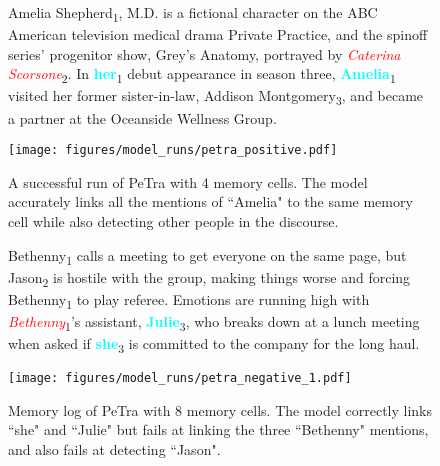 \documentclass[11pt,a4paper]{article}
\newcommand{\actcoref}{\textsc{coref}\xspace}
\newcommand{\actoverwrite}{\textsc{overwrite}\xspace}
\newcommand{\modelname}{PeTra\xspace}
\newcommand{\hlent}[2]{\colorbox{gray!30}{#1\textsubscript{#2}}}
\begin{document}
\begin{figure*}[!ht]
    \centering

    \begin{subfigure}[t]{\textwidth}
    \begin{mdframed}
        \footnotesize{
        \hlent{Amelia Shepherd}{1}, M.D. is a fictional character on the ABC American television medical drama Private Practice, and the spinoff series' progenitor show, Grey's Anatomy, portrayed by \hlent{\textcolor{red}{\it Caterina Scorsone}}{2}. In \hlent{\textcolor{aqua}{\bf her}}{1} debut appearance in season three, \hlent{\textcolor{aqua}{\bf Amelia}}{1} visited her former sister-in-law, \hlent{Addison Montgomery}{3}, and became a partner at the Oceanside Wellness Group.
        }
    \end{mdframed}
    \end{subfigure}
    \begin{subfigure}[t]{\textwidth}
    \texttt{[image: figures/model\_runs/petra\_positive.pdf]}
    \caption{A successful run of \modelname with 4 memory cells. The model accurately links all the mentions of ``Amelia" to the same memory cell while also detecting other people in the discourse.}
    \label{fig:success}
    \end{subfigure}
    \begin{subfigure}[t]{\textwidth}
    \begin{mdframed}
        \footnotesize{
        \hlent{Bethenny}{1} calls a meeting to get everyone on the same page, but \hlent{Jason}{2} is hostile with the group, making things worse and forcing \hlent{Bethenny}{1} to play referee. Emotions are running high with \hlent{\textcolor{red}{\it Bethenny}}{1}'s assistant, \hlent{\textcolor{aqua}{\bf Julie}}{3}, who breaks down at a lunch meeting when asked if \hlent{\textcolor{aqua}{\bf she}}{3} is committed to the company for the long haul.
        }
    \end{mdframed}
    \end{subfigure}
    \begin{subfigure}[t]{\textwidth}
    \texttt{[image: figures/model\_runs/petra\_negative\_1.pdf]}
    \caption{Memory log of \modelname with 8 memory cells. The model correctly links ``she" and ``Julie" but fails at linking the three ``Bethenny" mentions, and also fails at detecting ``Jason".}
    \label{fig:failure}
    \end{subfigure}
    \caption{Visualization of memory logs for different configurations of \modelname.
    The documents have their GAP annotations highlighted in red (italics) and blue (bold), with blue (bold) corresponding to the right answer. For illustration purposes only, we highlight all the spans corresponding to mentions of people and mark cluster indices as subscript.
    In the plot, X-axis corresponds to document tokens, and Y-axis corresponds to memory cells. Each memory cell has the OW=\actoverwrite and CR=\actcoref labels. Darker color implies higher value.
    We skip text, indicated via ellipsis, when the model doesn't detect people for extended lengths of text.}
    \label{fig:visualize}
\end{figure*}
\end{document}
